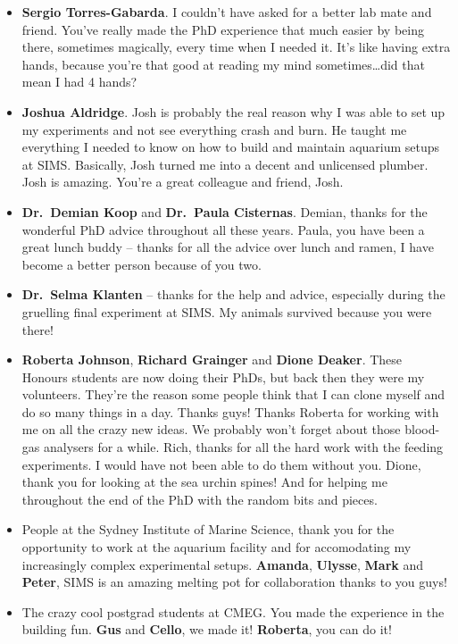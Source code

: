 \documentclass[a4paper,10pt, oneside]{memoir}
\begin{document}
\begin{itemize}
\item
  \textbf{Sergio Torres-Gabarda}. I couldn't have asked for a better lab mate and friend. You've really made the PhD experience that much easier by being there, sometimes magically, every time when I needed it. It's like having extra hands, because you're that good at reading my mind sometimes\ldots{}did that mean I had 4 hands?
\item
  \textbf{Joshua Aldridge}. Josh is probably the real reason why I was able to set up my experiments and not see everything crash and burn. He taught me everything I needed to know on how to build and maintain aquarium setups at SIMS. Basically, Josh turned me into a decent and unlicensed plumber. Josh is amazing. You're a great colleague and friend, Josh.
\item
  \textbf{Dr.~Demian Koop} and \textbf{Dr.~Paula Cisternas}. Demian, thanks for the wonderful PhD advice throughout all these years. Paula, you have been a great lunch buddy -- thanks for all the advice over lunch and ramen, I have become a better person because of you two.
\item
  \textbf{Dr.~Selma Klanten} -- thanks for the help and advice, especially during the gruelling final experiment at SIMS. My animals survived because you were there!
\item
  \textbf{Roberta Johnson}, \textbf{Richard Grainger} and \textbf{Dione Deaker}. These Honours students are now doing their PhDs, but back then they were my volunteers. They're the reason some people think that I can clone myself and do so many things in a day. Thanks guys! Thanks Roberta for working with me on all the crazy new ideas. We probably won't forget about those blood-gas analysers for a while. Rich, thanks for all the hard work with the feeding experiments. I would have not been able to do them without you. Dione, thank you for looking at the sea urchin spines! And for helping me throughout the end of the PhD with the random bits and pieces.
\item
  People at the Sydney Institute of Marine Science, thank you for the opportunity to work at the aquarium facility and for accomodating my increasingly complex experimental setups. \textbf{Amanda}, \textbf{Ulysse}, \textbf{Mark} and \textbf{Peter}, SIMS is an amazing melting pot for collaboration thanks to you guys!
\item
  The crazy cool postgrad students at CMEG. You made the experience in the building fun. \textbf{Gus} and \textbf{Cello}, we made it! \textbf{Roberta}, you can do it!
\end{itemize}
\end{document}
